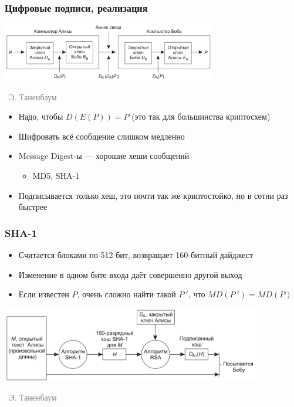 \documentclass[xetex,mathserif,serif]{beamer}
\newcommand{\attribution}[1] {
\vspace{-5mm}\begin{flushright}\begin{scriptsize}\textcolor{gray}{\textcopyright\, #1}\end{scriptsize}\end{flushright}
}
\begin{document}
	\begin{frame}
		\frametitle{Цифровые подписи, реализация}
		\begin{center}
			\includegraphics[width=0.7\textwidth]{signature.png}
			\attribution{Э. Таненбаум}
		\end{center}
		\begin{itemize}
			\item Надо, чтобы $D(E(P)) = P$ (это так для большинства криптосхем)
			\item Шифровать всё сообщение слишком медленно
			\item Message Digest-ы --- хорошие хеши сообщений
			\begin{itemize}
				\item MD5, SHA-1
			\end{itemize}
			\item Подписывается только хеш, это почти так же криптостойко, но в сотни раз быстрее
		\end{itemize}
	\end{frame}

	\begin{frame}
		\frametitle{SHA-1}
		\begin{itemize}
			\item Считается блоками по 512 бит, возвращает 160-битный дайджест
			\item Изменение в одном бите входа даёт совершенно другой выход
			\item Если известен $P$, очень сложно найти такой $P\ '$, что $MD(P\ ') = MD(P)$
		\end{itemize}
		\begin{center}
			\includegraphics[width=0.85\textwidth]{sha1Signature.png}
			\attribution{Э. Таненбаум}
		\end{center}
	\end{frame}
\end{document}
